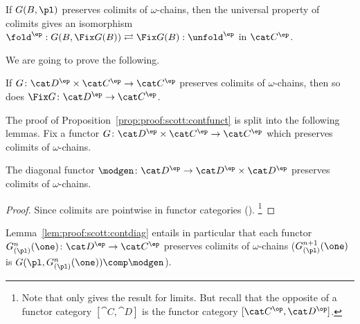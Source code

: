 If $G(B,\pl)$ preserves colimits of $\omega$-chains,
then the universal property of colimits gives an isomorphism
\(
  \fold^\ep
  :
  G(B,\Fix G(B))
  \rightleftarrows
  \Fix G(B)
  :
  \unfold^\ep
\)
in $\cat C^\ep$.

We are going to prove the following.

\begin{proposition}
\label{prop:proof:scott:contfunct}
If $G \colon \cat D^\ep \times \cat C^\ep \to \cat C^\ep$
preserves colimits of $\omega$-chains,
then so does $\Fix G \colon \cat D^\ep \to \cat C^\ep$.
\end{proposition}

The proof of Proposition~\ref{prop:proof:scott:contfunct}
is split into the following lemmas.
Fix a functor $G \colon \cat D^\ep \times \cat C^\ep \to \cat C^\ep$
which preserves colimits of $\omega$-chains.

\begin{lemma}
\label{lem:proof:scott:contdiag}
The diagonal functor $\modgen \colon \cat D^\ep \to \cat D^\ep \times \cat D^\ep$
preserves colimits of $\omega$-chains.
\end{lemma}

\begin{proof}
Since colimits are pointwise in functor categories
(\cite[Corollary V.3]{maclane98book}).%
\footnote{Note that \cite[Corollary V.3]{maclane98book} only gives the result for limits.
But recall that the opposite of a functor category $[\cat C,\cat D]$
is the functor category $[\cat C^\op, \cat D^\op]$.}
\end{proof}

Lemma~\ref{lem:proof:scott:contdiag}
entails in particular that each functor
$G^n_{(\pl)}(\one) \colon \cat D^\ep \to \cat C^\ep$
preserves colimits of $\omega$-chains
($G^{n+1}_{(\pl)}(\one)$ is
$G(\pl,G^{n}_{(\pl)}(\one)) \comp \modgen$).

